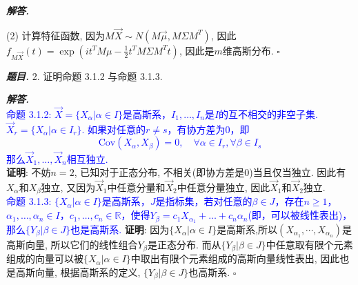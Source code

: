 \documentclass[10pt, a4paper, oneside]{ctexart}
\newenvironment{problem}{\begin{framed}\par\noindent\textbf{\textit{题目. }}}{\end{framed}\par}
\newenvironment{solution}{%
  \par\noindent\textbf{\textit{解答. }}\ignorespaces
}{%
  \hfill\ensuremath{\square}\par %
}
\begin{document}
\begin{solution}
(2) 计算特征函数, 因为$M\vec{X}\sim N(M\vec{\mu},M\Sigma M^T)$, 因此$f_{M\vec{X}}(t)=\exp(it^TM\mu-\frac{1}{2}t^T M\Sigma M^T t)$, 因此是$m$维高斯分布.
\end{solution}

\begin{problem}
    2. 证明命题 3.1.2 与命题 3.1.3.
\end{problem}
\begin{solution}\\
\textcolor{blue}{命题 3.1.2: $\vec{X}=\{X_{\alpha}|\alpha\in I\}$是高斯系，$I_{1},\dots,I_{n}$是$I$的互不相交的非空子集. $\vec{X}_{r}=\{X_{\alpha}|\alpha\in I_{r}\}$. 如果对任意的$r\neq s$，有协方差为$0$，即
$$
\text{Cov}(X_{\alpha},X_{\beta})=0,\quad \forall \alpha\in I_{r},\forall \beta \in I_{s}
$$
那么$\vec{X}_{1},\dots,\vec{X}_{n}$相互独立.}\\
\textbf{证明}: 不妨$n=2$, 已知对于正态分布, 不相关(即协方差是$0$)当且仅当独立. 因此有$X_{\alpha}$和$X_{\beta}$独立, 又因为$\vec{X}_1$中任意分量和$\vec{X}_2$中任意分量独立, 因此$\vec{X}_1$和$\vec{X}_2$独立.\\
\textcolor{blue}{命题 3.1.3: $\{X_{\alpha}|\alpha\in I\}$是高斯系，$J$是指标集，若对任意的$\beta\in J$，存在$n\geq 1$，$\alpha_{1},\dots,\alpha_{n}\in I$，$c_{1},\dots,c_{n}\in \mathbb{R}$，使得$Y_{\beta}=c_{1}X_{\alpha_{1}}+\dots+c_{n}\alpha_{n}$(即，可以被线性表出)，那么$\{Y_{\beta}|\beta \in J\}$也是高斯系.}
\textbf{证明}: 因为$\{X_{\alpha}|\alpha\in I\}$是高斯系,所以$(X_{\alpha_1},\cdots,X_{\alpha_n})$是高斯向量, 所以它们的线性组合$Y_{\beta}$是正态分布. 而从$\{Y_{\beta}|\beta \in J\}$中任意取有限个元素组成的向量可以被$\{X_{\alpha}|\alpha\in I\}$中取出有限个元素组成的高斯向量线性表出, 因此也是高斯向量, 根据高斯系的定义, $\{Y_{\beta}|\beta \in J\}$也高斯系.
\end{solution}
\end{document}
